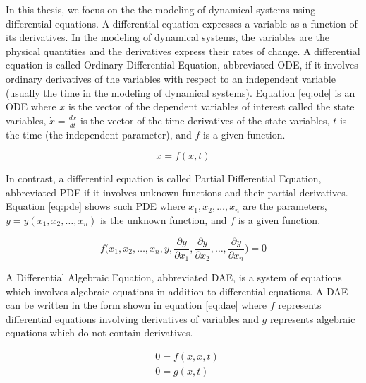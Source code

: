 In this thesis, we focus on the the modeling of dynamical systems using differential equations. A differential equation expresses a variable as a function of its derivatives. In the modeling of dynamical systems, the variables are the physical quantities and the derivatives express their rates of change. A differential equation is called Ordinary Differential Equation, abbreviated ODE, if it involves ordinary derivatives of the variables with respect to an independent variable (usually the time in the modeling of dynamical systems).  Equation \ref{eq:ode} is an ODE where $x$ is the vector of the dependent variables of interest called the state variables, $\dot{x} = \frac{dx}{dt}$ is the vector of the time derivatives of the state variables, $t$ is the time (the independent parameter), and $f$ is a given function.

\begin{equation}
\dot{x} = f(x,t)
\label{eq:ode}
\end{equation}

In contrast, a differential equation is called Partial Differential Equation, abbreviated PDE if it involves unknown functions and their partial derivatives. Equation \ref{eq:pde} shows such PDE where $x_1,x_2,\dots, x_n$ are the parameters, $y=y(x_1,x_2,\dots, x_n)$ is the unknown function, and $f$ is a given function.

\begin{equation}
f\biggl(x_1,x_2,\dots, x_n,y,\frac{\partial y}{\partial x_1},\frac{\partial y}{\partial x_2},\dots,\frac{\partial y}{\partial x_n}\biggl)=0
\label{eq:pde}
\end{equation} 

A Differential Algebraic Equation, abbreviated DAE, is a system of equations which involves algebraic equations in addition to differential equations. A DAE can be written in the form shown in equation \ref{eq:dae} where $f$ represents differential equations involving derivatives of variables and $g$ represents algebraic equations which do not contain derivatives.

\begin{equation}
\begin{aligned}
&0 = f(\dot{x},x,t)\\
&0 = g(x,t)
\end{aligned}
\label{eq:dae}
\end{equation} 
  
